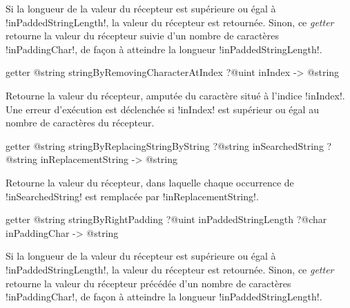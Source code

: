 Si la longueur de la valeur du récepteur est supérieure ou égal à \ggst!inPaddedStringLength!, la valeur du récepteur est retournée. Sinon, ce \emph{getter} retourne la valeur du récepteur suivie d'un nombre de caractères \ggst!inPaddingChar!, de façon à atteindre la longueur \ggst!inPaddedStringLength!.








\begin{galgas3box}
getter @string stringByRemovingCharacterAtIndex ?@uint inIndex -> @string
\end{galgas3box}

Retourne la valeur du récepteur, amputée du caractère situé à l'indice \ggst!inIndex!. Une erreur d'exécution est déclenchée si \ggst!inIndex! est supérieur ou égal au nombre de caractères du récepteur.








\begin{galgas3box}
getter @string stringByReplacingStringByString
     ?@string inSearchedString
     ?@string inReplacementString  -> @string
\end{galgas3box}

Retourne la valeur du récepteur, dans laquelle chaque occurrence de \ggst!inSearchedString! est remplacée par \ggst!inReplacementString!.








\begin{galgas3box}
getter @string stringByRightPadding
   ?@uint inPaddedStringLength
   ?@char inPaddingChar -> @string
\end{galgas3box}

Si la longueur de la valeur du récepteur est supérieure ou égal à \ggst!inPaddedStringLength!, la valeur du récepteur est retournée. Sinon, ce \emph{getter} retourne la valeur du récepteur précédée d'un nombre de caractères \ggst!inPaddingChar!, de façon à atteindre la longueur \ggst!inPaddedStringLength!.




